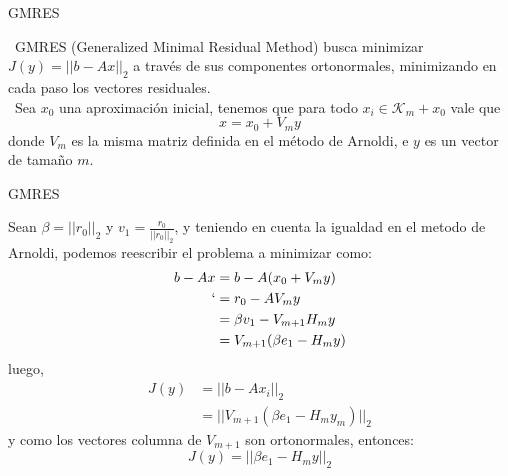 \documentclass[12pt]{beamer}
\begin{document}
	\begin{frame}{GMRES}
		
		\ GMRES (Generalized Minimal Residual Method) busca minimizar $J(y)=||b-Ax||_2$ a través de sus componentes ortonormales, minimizando en cada paso los vectores residuales. \\
		\ Sea $x_0$ una aproximación inicial, tenemos que para todo $x_i\in\mathcal{K}_m+x_0$ vale que $$x=x_0+V_my$$ donde $V_m$ es la misma matriz definida en el método de Arnoldi, e $y$ es un vector de tamaño $m$.
		
	\end{frame}
	
	\begin{frame}{GMRES}
		
		Sean $\beta = ||r_0||_2$ y $v_1=\frac{r_0}{||r_0||_2}$, y teniendo en cuenta la igualdad en el metodo de Arnoldi, podemos reescribir el problema a minimizar como:
		\begin{equation*}
			\begin{split}
				b-Ax&=b-A(x_0+V_my)\\
				`    &= r_0-AV_my\\
				&= \beta v_1-V_{m+1}H_my\\
				&= V_{m+1}(\beta e_1 - H_my)
			\end{split}
		\end{equation*}
		luego, 
		\begin{equation*}
			\begin{split}
				J(y)&=||b-Ax_i||_2\\
				&=||V_{m+1}(\beta e_1 - H_my_m)||_2    
			\end{split}
		\end{equation*}
		y como los vectores columna de $V_{m+1}$ son ortonormales, entonces:
		$$J(y)=||\beta e_1 - H_my||_2$$
		
	\end{frame}
	
\end{document}
